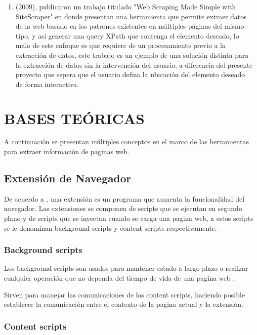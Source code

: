 \documentclass[12pt]{report}
\begin{document}
\begin{enumerate}
\item \citeauthor{penman2009web} (2009), publicaron un trabajo titulado "Web Scraping Made Simple with SiteScraper" en donde presentan una herramienta que permite extraer datos de la web basado en los patrones existentes en múltiples páginas del mismo tipo, y así generar una query XPath que contenga el elemento deseado, lo malo de este enfoque es que requiere de un procesamiento previo a la extracción de datos, este trabajo es un ejemplo de una solución distinta para la extracción de datos sin la intervención del usuario, a diferencia del presente proyecto que espera que el usuario defina la ubicación del elemento deseado de forma interactiva.

\end{enumerate}

\break

\section[Bases Teóricas]{BASES TEÓRICAS}

A continuación se presentan múltiples conceptos en el marco de las herramientas para extraer información de paginas web.

\subsection{Extensión de Navegador}

De acuerdo a \cite{md2022extensions}, una extensión es un programa que aumenta la funcionalidad del navegador. Las extensiones se componen de scripts que se ejecutan en segundo plano y de scripts que se inyectan cuando se carga una pagina web, a estos scripts se le denominan background scripts y content scripts respectivamente.

\subsubsection{Background scripts}

Los background scripts son usados para mantener estado a largo plazo o realizar cualquier operación que no dependa del tiempo de vida de una pagina web \cite{md2022background}. \par
Sirven para manejar las comunicaciones de los content scripts, haciendo posible establecer la comunicación entre el contexto de la pagina actual y la extensión.

\subsubsection{Content scripts}
\end{document}
